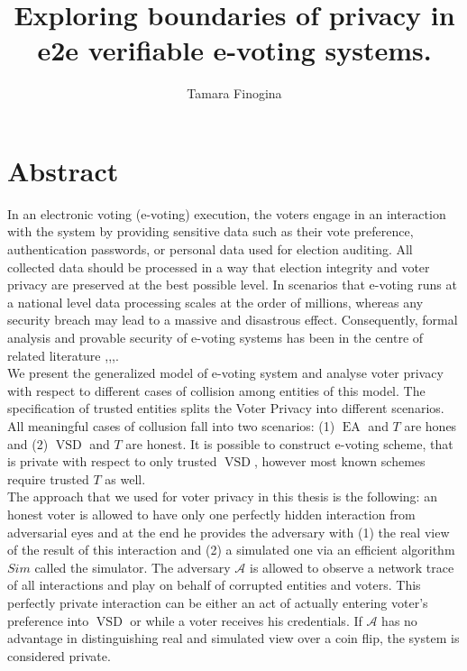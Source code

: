 \documentclass[12pt]{article}
\author{Tamara Finogina}
\title{Exploring boundaries of privacy in e2e verifiable e-voting systems.}
\date{}
\DeclareMathOperator{\vsd}{VSD}
\DeclareMathOperator{\ea}{EA}
\begin{document}
\maketitle
\tableofcontents
\newpage
\section{Abstract}
In an electronic voting (e-voting) execution, the voters engage in an interaction with the system by providing sensitive data such as their vote preference, authentication passwords, or personal data used for election auditing. All collected data should be processed in a way that election integrity and voter privacy are preserved at the best possible level. In scenarios that e-voting runs at a national level data processing scales at the order of millions, whereas any security breach may lead to a massive and disastrous effect. Consequently, formal analysis and provable security of e-voting systems has been in the centre of related literature \cite{Kiayias2006},\cite{Cohen1985},\cite{Benaloh2014},\cite{Adida2008}.\\ 

We present the generalized model of e-voting system and analyse voter privacy with respect to different cases of collision among entities of this model. The specification of trusted entities splits the Voter Privacy into different scenarios. All meaningful cases of collusion fall into two scenarios: (1) $\ea$ and $T$ are hones and (2) $\vsd$ and $T$ are honest. It is possible to construct e-voting scheme, that is private with respect to only trusted $\vsd$, however most known schemes require trusted $T$ as well.  \\
 
The approach that we used for voter privacy in this thesis is the following: an honest voter is allowed to have only one perfectly hidden interaction from adversarial eyes and at the end he provides the adversary with (1) the real view of the result of this interaction and (2) a simulated one via an efficient algorithm $Sim$ called the simulator. The adversary $\mathcal{A}$ is allowed to observe a network trace of all interactions and play on behalf of corrupted entities and voters. This perfectly private interaction can be either an act of actually entering voter's preference into $\vsd$ or while a voter receives his credentials. If $\mathcal{A}$ has no advantage in distinguishing real and simulated view over a coin flip, the system is considered private.\\
\end{document}
